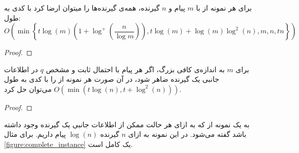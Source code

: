 \begin{theorem}
	\cite{pliable2015paper}
	\label{thm:pliable2015_7}
	برای هر نمونه از
	با
	$m$
	پیام و
	$n$
	گیرنده، همه‌ی گیرنده‌ها را میتوان ارضا کرد با کدی به طول:
	\begin{equation}
		O\left( \min\left\{ t \log(m) (1 + \log^{+}(\dfrac{n}{\log m})), t \log(m) + \log(m) \log^2(n), m, n, tn\right\}\right)
	\end{equation}
\end{theorem}
\begin{proof}
\end{proof}
\begin{theorem}
		\cite{pliable2015paper}
	\label{thm:pliable2015_8}
	برای
	$m$
	به اندازه‌ی کافی بزرگ، اگر هر پیام با احتمال ثابت و مشخص 
	$q$
	در اطلاعات جانبی یک گیرنده ضاهر شود، در آن صورت هر نمونه از
	را با کدی به طول
	$O(\min(t \log(n), t + \log^2(n)))$
	می‌توان حل کرد.
\end{theorem}
\begin{proof}
\end{proof}
\begin{definition}
	به یک نمونه از
	\picod
	که به ازای هر حالت ممکن از اطلاعات جانبی یک گیرنده وجود داشته باشد گفته می‌شود. در این نمونه به ازای
	$n$
	گیرنده
	$\log(n)$
	پیام داریم.	 برای مثال
	\autoref{figure:complete_instance}
	یک
	\picod
	کامل است.
\end{definition}
